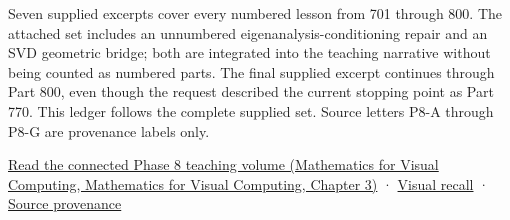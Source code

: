 Seven supplied excerpts cover every numbered lesson from 701 through 800. The attached set includes an unnumbered eigenanalysis-conditioning repair and an SVD geometric bridge; both are integrated into the teaching narrative without being counted as numbered parts. The final supplied excerpt continues through Part 800, even though the request described the current stopping point as Part 770. This ledger follows the complete supplied set. Source letters P8-A through P8-G are provenance labels only.

\href{../02-Mathematics-for-Visual-Computing/main.pdf\#nameddest=01-foundations-i-ch019-the-graphics-problem-hiding-inside-a-matrix-equation}{Read the connected Phase 8 teaching volume (Mathematics for Visual Computing, Mathematics for Visual Computing, Chapter 3)} · \hyperref[appendix-932cf7182ff1]{Visual recall} · \hyperref[appendix-a103e7846d21-phase-8---source-analysis-and-verification]{Source provenance}

